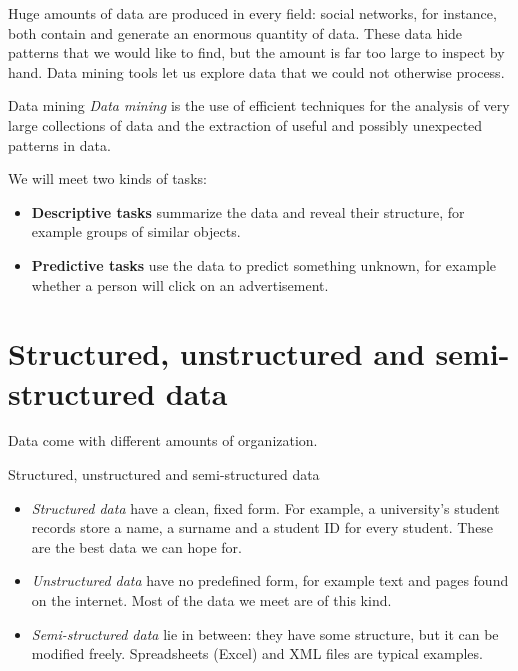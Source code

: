 \documentclass[a4paper,12pt,oneside]{report}
\begin{document}
Huge amounts of data are produced in every field: social networks,
for instance, both contain and generate an enormous quantity of data.
These data hide patterns that we would like to find, but the amount is
far too large to inspect by hand. Data mining tools let us explore
data that we could not otherwise process.

\begin{frameddefn}{Data mining}\label{def:data-mining}
\emph{Data mining} is the use of efficient techniques for the analysis
of very large collections of data and the extraction of useful and
possibly unexpected patterns in data.
\end{frameddefn}

We will meet two kinds of tasks:
\begin{itemize}
  \item \textbf{Descriptive tasks} summarize the data and reveal their
    structure, for example groups of similar objects.
  \item \textbf{Predictive tasks} use the data to predict something
    unknown, for example whether a person will click on an advertisement.
\end{itemize}

\section{Structured, unstructured and semi-structured data}

Data come with different amounts of organization.

\begin{frameddefn}{Structured, unstructured and semi-structured data}
\label{def:data-structure-levels}
\begin{itemize}
  \item \emph{Structured data} have a clean, fixed form. For example,
    a university's student records store a name, a surname and a
    student ID for every student. These are the best data we can hope
    for.
  \item \emph{Unstructured data} have no predefined form, for example
    text and pages found on the internet. Most of the data we meet are
    of this kind.
  \item \emph{Semi-structured data} lie in between: they have some
    structure, but it can be modified freely. Spreadsheets (Excel) and
    XML files are typical examples.
\end{itemize}
\end{frameddefn}
\end{document}
